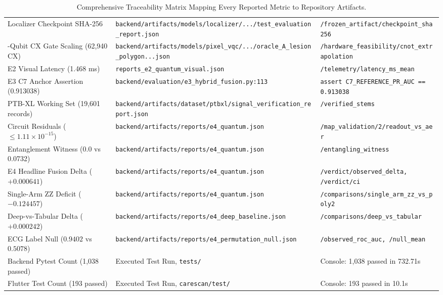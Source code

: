 \documentclass[11pt,a4paper]{report}
\newcommand{\artifact}[1]{\nolinkurl{#1}}
\newcommand{\keypath}[1]{\nolinkurl{#1}}
\begin{document}
\begin{table}[H]
\begin{tabularx}{\textwidth}{>{\raggedright\arraybackslash}p{3.2cm} >{\raggedright\arraybackslash\sloppy}X >{\raggedright\arraybackslash\sloppy}p{4.2cm}}
Localizer Checkpoint SHA-256 & \artifact{backend/artifacts/models/localizer/.../test_evaluation_report.json} & \keypath{/frozen_artifact/checkpoint_sha256} \\
16-Qubit CX Gate Scaling (62,940 CX) & \artifact{backend/artifacts/models/pixel_vqc/.../oracle_A_lesion_polygon...json} & \keypath{/hardware_feasibility/cnot_extrapolation} \\
E2 Visual Latency (1.468 ms) & \artifact{reports_e2_quantum_visual.json} & \keypath{/telemetry/latency_ms_mean} \\
E3 C7 Anchor Assertion (0.913038) & \artifact{backend/evaluation/e3_hybrid_fusion.py:113} & \keypath{assert C7_REFERENCE_PR_AUC == 0.913038} \\
PTB-XL Working Set (19,601 records) & \artifact{backend/artifacts/dataset/ptbxl/signal_verification_report.json} & \keypath{/verified_stems} \\
Circuit Residuals ($\le 1.11 \times 10^{-15}$) & \artifact{backend/artifacts/reports/e4_quantum.json} & \keypath{/map_validation/2/readout_vs_aer} \\
Entanglement Witness (0.0 vs 0.0732) & \artifact{backend/artifacts/reports/e4_quantum.json} & \keypath{/entangling_witness} \\
E4 Headline Fusion Delta ($+0.000641$) & \artifact{backend/artifacts/reports/e4_quantum.json} & \keypath{/verdict/observed_delta, /verdict/ci} \\
Single-Arm ZZ Deficit ($-0.124457$) & \artifact{backend/artifacts/reports/e4_quantum.json} & \keypath{/comparisons/single_arm_zz_vs_poly2} \\
Deep-vs-Tabular Delta ($+0.000242$) & \artifact{backend/artifacts/reports/e4_deep_baseline.json} & \keypath{/comparisons/deep_vs_tabular} \\
ECG Label Null ($0.9402$ vs $0.5078$) & \artifact{backend/artifacts/reports/e4_permutation_null.json} & \keypath{/observed_roc_auc, /null_mean} \\
Backend Pytest Count (1,038 passed) & Executed Test Run, \artifact{tests/} & Console: 1,038 passed in 732.71s \\
Flutter Test Count (193 passed) & Executed Test Run, \artifact{carescan/test/} & Console: 193 passed in 10.1s \\
\bottomrule
\end{tabularx}
\caption{Comprehensive Traceability Matrix Mapping Every Reported Metric to Repository Artifacts.}
\label{tab:traceability_matrix}
\end{table}
\end{document}
